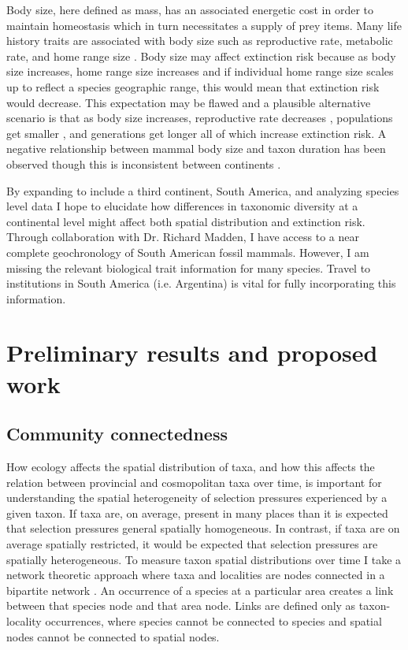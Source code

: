 \documentclass[11pt,letterpaper]{article}
\begin{document}
Body size, here defined as mass, has an associated energetic cost in order to maintain homeostasis which in turn necessitates a supply of prey items. Many life history traits are associated with body size such as reproductive rate, metabolic rate, and home range size \cite{Peters1983a,Damuth1979,Brown1987,Smith2004}. Body size may affect extinction risk because as body size increases, home range size increases \citep{Damuth1979} and if individual home range size scales up to reflect a species geographic range, this would mean that extinction risk would decrease. This expectation may be flawed and a plausible alternative scenario is that as body size increases, reproductive rate decreases \citep{Johnson2002b}, populations get smaller \citep{White2007}, and generations get longer \citep{Martin1993a} all of which increase extinction risk. A negative relationship between mammal body size and taxon duration has been observed \citep{Liow2008,Davidson2012} though this is inconsistent between continents \citep{Tomiya2013,Liow2008}. 

By expanding to include a third continent, South America, and analyzing species level data I hope to elucidate how differences in taxonomic diversity at a continental level might affect both spatial distribution and extinction risk. Through collaboration with Dr. Richard Madden, I have access to a near complete geochronology of South American fossil mammals. However, I am missing the relevant biological trait information for many species. Travel to institutions in South America (i.e. Argentina) is vital for fully incorporating this information.

\section{Preliminary results and proposed work}
\subsection{Community connectedness}
How ecology affects the spatial distribution of taxa, and how this affects the relation between provincial and cosmopolitan taxa over time, is important for understanding the spatial heterogeneity of selection pressures experienced by a given taxon. If taxa are, on average, present in many places than it is expected that selection pressures general spatially homogeneous. In contrast, if taxa are on average spatially restricted, it would be expected that selection pressures are spatially heterogeneous. To measure taxon spatial distributions over time I take a network theoretic approach where taxa and localities are nodes connected in a bipartite network \citep{Sidor2013,Vilhena2013,Vilhena2013b}. An occurrence of a species at a particular area creates a link between that species node and that area node. Links are defined only as taxon-locality occurrences, where species cannot be connected to species and spatial nodes cannot be connected to spatial nodes. %
\end{document}
